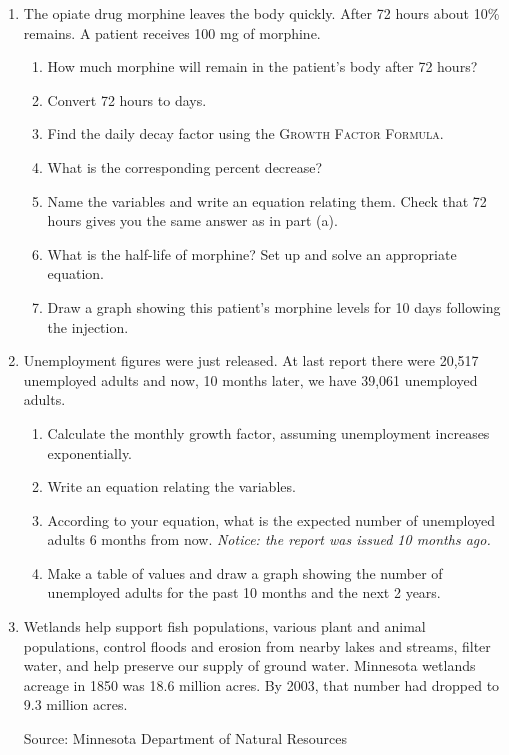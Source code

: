 \begin{enumerate}
\item The opiate drug morphine leaves the body quickly.  After 72 hours about 10\% remains.  A patient receives 100 mg of morphine.
\begin{enumerate}
\item How much morphine will remain in the patient's body after 72 hours?
\item Convert 72 hours to days.
\item Find the daily decay factor using the \textsc{Growth Factor Formula}.
\item What is the corresponding percent decrease?
\item Name the variables and write an equation relating them.  Check that 72 hours gives you the same answer as in part (a).
\item What is the half-life of morphine?  Set up and solve an appropriate equation.
\item Draw a graph showing this patient's morphine levels for 10 days following the injection.
\end{enumerate}

\item Unemployment figures were just released.  At last report there were 20,517 unemployed adults and now, 10 months later, we have 39,061 unemployed adults.  \begin{enumerate}
\item Calculate the monthly growth factor, assuming unemployment increases exponentially.
\item Write an equation relating the variables.
\item According to your equation, what is the expected number of unemployed adults 6 months from now.  \emph{Notice:  the report was issued 10 months ago.}
\item Make a table of values and draw a graph showing the number of unemployed adults for the past 10 months and the next 2 years.
\end{enumerate}

\item Wetlands help support fish populations, various plant and animal populations, control floods and erosion from nearby lakes and streams, filter water, and help preserve our supply of ground water. 
 Minnesota wetlands acreage in 1850 was 18.6 million acres.  By 2003, that number had dropped to 9.3 million acres. 
 
 \hfill \begin{footnotesize} Source:  Minnesota Department of Natural Resources \end{footnotesize}


\end{enumerate}
